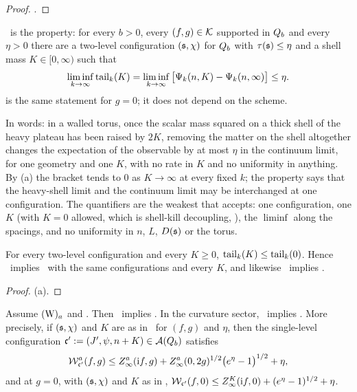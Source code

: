 \begin{proof}
.
\end{proof}

\begin{definition}\label{rot:hyp:RES}
\textbf{\REa}\ is the property: for every $b>0$, every $(f,g)\in\mathcal K$ supported in $Q_{b}$ and every $\eta>0$ there are a two-level configuration $(\mathfrak s,\chi)$ for $Q_{b}$ with $\tau(\mathfrak s)\le\eta$ and a shell mass $K\in[0,\infty)$ such that
\[
\liminf_{k\to\infty}\operatorname{tail}_k(K)=\liminf_{k\to\infty}\big[\Psi_k(n,K)-\Psi_k(n,\infty)\big]\le\eta .
\]
\textbf{\REz} is the same statement for $g=0$; it does not depend on the scheme.
\end{definition}

In words: in a walled torus, once the scalar mass squared on a thick shell of the heavy plateau has been raised by $2K$, removing the matter on the shell altogether changes the expectation of the observable by at most $\eta$ in the continuum limit, for one geometry and one $K$, with no rate in $K$ and no uniformity in anything. By (a) the bracket tends to $0$ as $K\to\infty$ at every fixed $k$; the property says that the heavy-shell limit and the continuum limit may be interchanged at one configuration. The quantifiers are the weakest that  accepts: one configuration, one $K$ (with $K=0$ allowed, which is shell-kill decoupling, ), the $\liminf$ along the spacings, and no uniformity in $n$, $L$, $D(\mathfrak s)$ or the torus.

\begin{proposition}\label{rot:prop:SHtoRES}
For every two-level configuration and every $K\ge0$, $\operatorname{tail}_k(K)\le\operatorname{tail}_k(0)$. Hence \SHa\ implies \REa\ with the same configurations and every $K$, and likewise \SHz\ implies \REz.
\end{proposition}

\begin{proof}
(a).
\end{proof}

\begin{theorem}\label{rot:thm:REStoTIGHT}
Assume $(\mathrm W)_{a}$ and \Ka. Then \REa\ implies \TIa. In the curvature sector, \REz\ implies \TIz. More precisely, if $(\mathfrak s,\chi)$ and $K$ are as in \REa\ for $(f,g)$ and $\eta$, then the single-level configuration $\mathfrak c':=(J',\psi,n+K)\in\mathcal A(Q_{b})$ satisfies
\[
\mathcal W^a_{\mathfrak c'}(f,g)\le Z^a_\infty(\mathrm if,g)+Z^a_\infty(0,2g)^{1/2}\big(e^{\eta}-1\big)^{1/2}+\eta ,
\]
and at $g=0$, with $(\mathfrak s,\chi)$ and $K$ as in \REz, $\mathcal W_{\mathfrak c'}(f,0)\le Z^{K}_{\infty}(\mathrm if,0)+(e^\eta-1)^{1/2}+\eta$.
\end{theorem}

